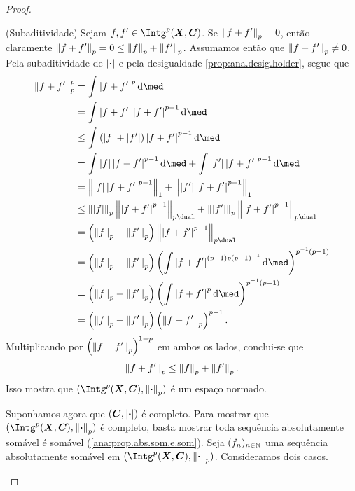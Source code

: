 \begin{proof}
\begin{enumerate}
(Subaditividade) Sejam $f,f' \in \Intg^p(\bm X,\bm C)$. Se $\left\Vert{f+f'}\right\Vert_p = 0$, então claramente $\left\Vert{f+f'}\right\Vert_p = 0 \leq \left\Vert{f}\right\Vert_p + \left\Vert{f'}\right\Vert_p$. Assumamos então que $\left\Vert{f+f'}\right\Vert_p \neq 0$. Pela subaditividade de $\left\vert{\bm{\cdot}}\right\vert$ e pela desigualdade \ref{prop:ana.desig.holder}, segue que
		\begin{align*}
		\nor{f+f'}_p^p &= \int \abs{f+f'}^p \dd\med \\
			&= \int \abs{f+f'}\abs{f+f'}^{p-1} \dd\med \\
			&\leq \int \left( \abs{f} + \abs{f'} \right) \abs{f+f'}^{p-1} \dd\med \\
			&= \int \abs{f}\abs{f+f'}^{p-1} \dd\med + \int \abs{f'}\abs{f+f'}^{p-1} \dd\med \\
			&= \nor{\abs{f}\abs{f+f'}^{p-1}}_1 + \nor{\abs{f'}\abs{f+f'}^{p-1}}_1 \\
			&\leq \nor{\abs{f}}_p \nor{\abs{f+f'}^{p-1}}_{p\dual} + \nor{\abs{f'}}_p \nor{\abs{f+f'}^{p-1}}_{p\dual} \\
			&= \left( \nor{f}_p + \nor{f'}_p \right) \nor{\abs{f+f'}^{p-1}}_{p\dual} \\
			&= \left( \nor{f}_p + \nor{f'}_p \right) \left( \int \abs{f+f'}^{(p-1) p (p-1)\inv} \dd\med \right)^{p\inv(p-1)} \\
			&= \left( \nor{f}_p + \nor{f'}_p \right) \left( \int \abs{f+f'}^p \dd\med \right)^{p\inv (p-1)} \\
			&= \left( \nor{f}_p + \nor{f'}_p \right) \left( \nor{f+f'}_p \right)^{p-1}.
		\end{align*}
Multiplicando por $\left( \left\Vert{f+f'}\right\Vert_p \right)^{1-p}$ em ambos os lados, conclui-se que
		\begin{equation*}
		\left\Vert{f+f'}\right\Vert_p \leq \left\Vert{f}\right\Vert_p + \left\Vert{f'}\right\Vert_p.
		\end{equation*}
Isso mostra que $(\Intg^p(\bm X,\bm C),\nor{\var}_p)$ é um espaço normado. 

Suponhamos agora que $(\bm C,\left\vert{\bm{\cdot}}\right\vert)$ é completo. Para mostrar que $(\Intg^p(\bm X,\bm C),\nor{\var}_p)$ é completo, basta mostrar toda sequência absolutamente somável é somável (\ref{ana:prop.abs.som.e.som}). Seja $(f_n)_{n \in \mathbb{N}}$ uma sequência absolutamente somável em $(\Intg^p(\bm X,\bm C),\nor{\var}_p)$. Consideramos dois casos.
	\begin{enumerate}

\end{enumerate}
\end{enumerate}
\end{proof}
